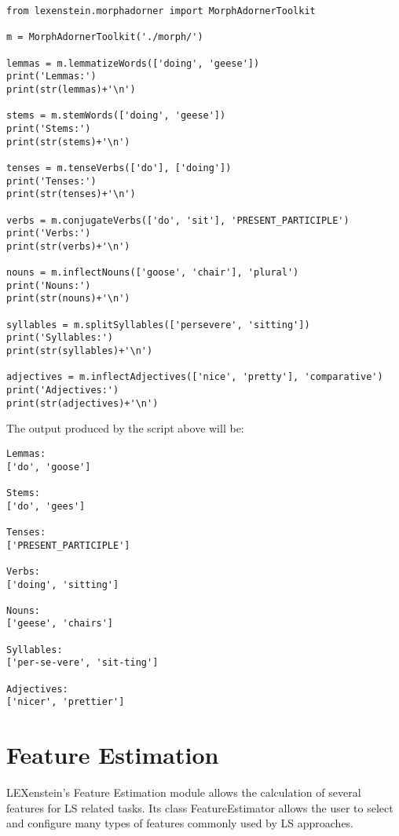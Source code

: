 \begin{lstlisting}
from lexenstein.morphadorner import MorphAdornerToolkit

m = MorphAdornerToolkit('./morph/')

lemmas = m.lemmatizeWords(['doing', 'geese'])
print('Lemmas:')
print(str(lemmas)+'\n')

stems = m.stemWords(['doing', 'geese'])
print('Stems:')
print(str(stems)+'\n')

tenses = m.tenseVerbs(['do'], ['doing'])
print('Tenses:')
print(str(tenses)+'\n')

verbs = m.conjugateVerbs(['do', 'sit'], 'PRESENT_PARTICIPLE')
print('Verbs:')
print(str(verbs)+'\n')

nouns = m.inflectNouns(['goose', 'chair'], 'plural')
print('Nouns:')
print(str(nouns)+'\n')

syllables = m.splitSyllables(['persevere', 'sitting'])
print('Syllables:')
print(str(syllables)+'\n')

adjectives = m.inflectAdjectives(['nice', 'pretty'], 'comparative')
print('Adjectives:')
print(str(adjectives)+'\n')
\end{lstlisting}

The output produced by the script above will be:

\begin{lstlisting}
Lemmas:
['do', 'goose']

Stems:
['do', 'gees']

Tenses:
['PRESENT_PARTICIPLE']

Verbs:
['doing', 'sitting']

Nouns:
['geese', 'chairs']

Syllables:
['per-se-vere', 'sit-ting']

Adjectives:
['nicer', 'prettier']
\end{lstlisting}












\section{Feature Estimation}
\label{features}

LEXenstein's Feature Estimation module allows the calculation of several features for LS related tasks. Its class FeatureEstimator allows the user to select and configure many types of features commonly used by LS approaches.

